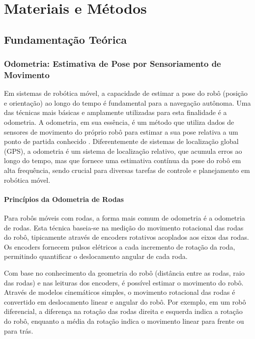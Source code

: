 \chapter{Materiais e Métodos}\label{cap:ferramentas}

\section{Fundamentação Teórica}

\subsection{Odometria: Estimativa de Pose por Sensoriamento de Movimento}

Em sistemas de robótica móvel, a capacidade de estimar a pose do robô (posição
e orientação) ao longo do tempo é fundamental para a navegação autônoma. Uma
das técnicas mais básicas e amplamente utilizadas para esta finalidade é a
odometria. A odometria, em sua essência, é um método que utiliza dados de
sensores de movimento do próprio robô para estimar a sua pose relativa a um
ponto de partida conhecido \cite{thrun2005}. Diferentemente de sistemas de
localização global (GPS), a odometria é um sistema de localização relativo, que
acumula erros ao longo do tempo, mas que fornece uma estimativa contínua da
pose do robô em alta frequência, sendo crucial para diversas tarefas de
controle e planejamento em robótica móvel.

\subsubsection{Princípios da Odometria de Rodas}

Para robôs móveis com rodas, a forma mais comum de odometria é a odometria de
rodas. Esta técnica baseia-se na medição do movimento rotacional das rodas do
robô, tipicamente através de encoders rotativos acoplados aos eixos das rodas.
Os encoders fornecem pulsos elétricos a cada incremento de rotação da roda,
permitindo quantificar o deslocamento angular de cada roda.

Com base no conhecimento da geometria do robô (distância entre as rodas, raio
das rodas) e nas leituras dos encoders, é possível estimar o movimento do robô.
Através de modelos cinemáticos simples, o movimento rotacional das rodas é
convertido em deslocamento linear e angular do robô. Por exemplo, em um robô
diferencial, a diferença na rotação das rodas direita e esquerda indica a
rotação do robô, enquanto a média da rotação indica o movimento linear para
frente ou para trás.

